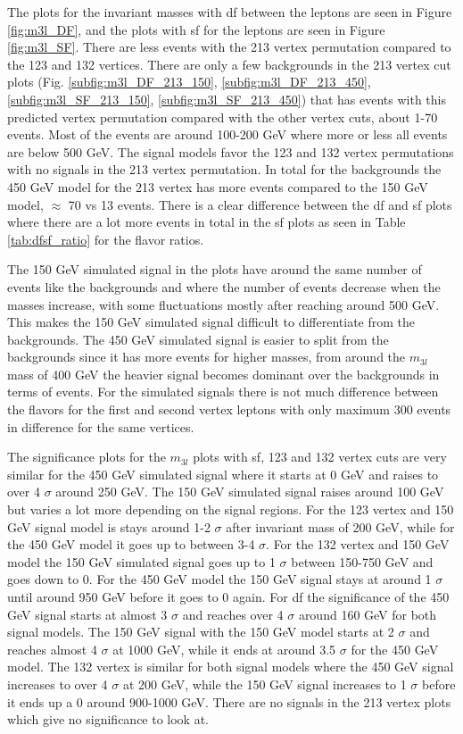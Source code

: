 \documentclass[a4paper, american, 12pt]{report}
\begin{document}
	The plots for the invariant masses with \acrshort{df} between the leptons are seen in Figure \ref{fig:m3l_DF}, and the plots with \acrshort{sf} for the leptons are seen in Figure \ref{fig:m3l_SF}. There are less events with the 213 vertex permutation compared to the 123 and 132 vertices. There are only a few backgrounds in the 213 vertex cut plots (Fig. \ref{subfig:m3l_DF_213_150}, \ref{subfig:m3l_DF_213_450}, \ref{subfig:m3l_SF_213_150}, \ref{subfig:m3l_SF_213_450}) that has events with this predicted vertex permutation compared with the other vertex cuts, about 1-70 events. Most of the events are around 100-200 GeV where more or less all events are below 500 GeV. The signal models favor the 123 and 132 vertex permutations with no signals in the 213 vertex permutation. In total for the backgrounds the 450 GeV model for the 213 vertex has more events compared to the 150 GeV model, $\approx$ 70 vs 13 events. There is a clear difference between the \acrshort{df} and \acrshort{sf} plots where there are a lot more events in total in the \acrshort{sf} plots as seen in Table \ref{tab:dfsf_ratio} for the flavor ratios. 
	
	The 150 GeV simulated signal in the plots have around the same number of events like the backgrounds and where the number of events decrease when the masses increase, with some fluctuations mostly after reaching around 500 GeV. This makes the 150 GeV simulated signal difficult to differentiate from the backgrounds. The 450 GeV simulated signal is easier to split from the backgrounds since it has more events for higher masses, from around the $m_{3l}$ mass of 400 GeV the heavier signal becomes dominant over the backgrounds in terms of events. For the simulated signals there is not much difference between the flavors for the first and second vertex leptons with only maximum 300 events in difference for the same vertices.
	
	The significance plots for the $m_{3l}$ plots with \acrshort{sf}, 123 and 132 vertex cuts are very similar for the 450 GeV simulated signal where it starts at 0 GeV and raises to over 4 $\sigma$ around 250 GeV. The 150 GeV simulated signal raises around 100 GeV but varies a lot more depending on the signal regions. For the 123 vertex and 150 GeV signal model is stays around 1-2 $\sigma$ after invariant mass of 200 GeV, while for the 450 GeV model it goes up to between 3-4 $\sigma$. For the 132 vertex and 150 GeV model the 150 GeV simulated signal goes up to 1 $\sigma$ between 150-750 GeV and goes down to 0. For the 450 GeV model the 150 GeV signal stays at around 1 $\sigma$ until around 950 GeV before it goes to 0 again. For \acrshort{df} the significance of the 450 GeV signal starts at almost 3 $\sigma$ and reaches over 4 $\sigma$ around 160 GeV for both signal models. The 150 GeV signal with the 150 GeV model starts at 2 $\sigma$ and reaches almost 4 $\sigma$ at 1000 GeV, while it ends at around 3.5 $\sigma$ for the 450 GeV model. The 132 vertex is similar for both signal models where the 450 GeV signal increases to over 4 $\sigma$ at 200 GeV, while the 150 GeV signal increases to 1 $\sigma$ before it ends up a 0 around 900-1000 GeV. There are no signals in the 213 vertex plots which give no significance to look at.
	
\end{document}
